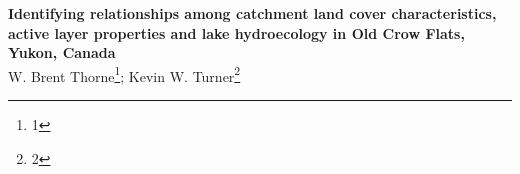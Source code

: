 \documentclass[article,30pt,extrafontsizes]{memoir}
\begin{document}
\begin{shaded}
\begingroup
  \centering
  \huge\textbf{Identifying relationships among catchment land cover characteristics,
active layer properties and lake hydroecology in Old Crow Flats, Yukon,
Canada}\\[0.3in]
  \Large W. Brent Thorne\footnote{1}; Kevin W. Turner\footnote{2}\par
\endgroup
\vspace{1.2in}
  \end{shaded}
\end{document}
